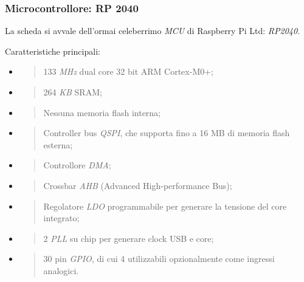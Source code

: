 \hypertarget{microcontrollore-rp-2040}{%
\subsubsection{\texorpdfstring{\hfill\break
Microcontrollore: RP
2040}{ Microcontrollore: RP 2040}}\label{microcontrollore-rp-2040}}

La scheda si avvale dell'ormai celeberrimo \emph{MCU} di Raspberry Pi Ltd: \emph{RP2040}.

Caratteristiche principali:

\begin{itemize}
\item
  \begin{quote}
  133 \emph{MHz} dual core 32 bit ARM Cortex-M0+;
  \end{quote}
\item
  \begin{quote}
  264 \emph{KB} SRAM;
  \end{quote}
\item
  \begin{quote}
  Nessuna memoria flash interna;
  \end{quote}
\item
  \begin{quote}
  Controller bus \emph{QSPI}, che supporta fino a 16 MB di memoria flash
  esterna;
  \end{quote}
\item
  \begin{quote}
  Controllore \emph{DMA};
  \end{quote}
\item
  \begin{quote}
  Crossbar \emph{AHB} (Advanced High-performance Bus);
  \end{quote}
\item
  \begin{quote}
  Regolatore \emph{LDO} programmabile per generare la tensione del core
  integrato;
  \end{quote}
\item
  \begin{quote}
  2 \emph{PLL} su chip per generare clock USB e core;
  \end{quote}
\item
  \begin{quote}
  30 pin \emph{GPIO}, di cui 4 utilizzabili opzionalmente come ingressi
  analogici.
  \end{quote}
\end{itemize}

